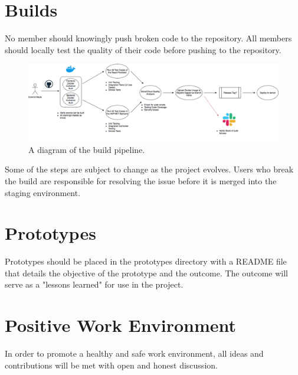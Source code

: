 \documentclass{scrreprt}
\begin{document}
\section{Builds}

No member should knowingly push broken code to the repository.
All members should locally test the quality of their code before
pushing to the repository. 

\begin{figure}[H]
    \includegraphics[width=\linewidth]{build-pipeline}
    \caption{A diagram of the build pipeline.}
    \label{fig:build}
\end{figure}

Some of the steps are subject to change as the project evolves.
Users who break the build are responsible for resolving the issue
before it is merged into the staging environment.

\section{Prototypes}

Prototypes should be placed in the prototypes directory with a README
file that details the objective of the prototype and the outcome. The
outcome will serve as a "lessons learned" for use in the project.

\section{Positive Work Environment}

In order to promote a healthy and safe work environment, all ideas and 
contributions will be met with open and honest discussion.
\end{document}
